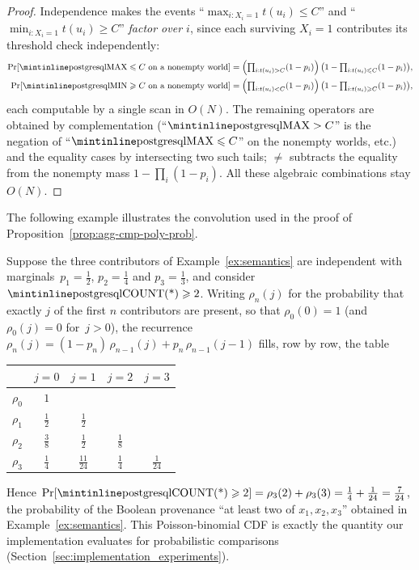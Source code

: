 \begin{proof}
Independence makes the events
``$\max_{i:X_i=1}t(u_i)\le C$''
and ``$\min_{i:X_i=1}t(u_i)\ge C$''
\emph{factor over $i$}, since each surviving $X_i=1$ contributes its
threshold check independently:
\begin{align*}
  \Pr[\text{\sql{MAX}}\le C\text{ on a nonempty world}]
 &=\Bigl(\textstyle\prod_{i:t(u_i)>C}(1-p_i)\Bigr)
   \,\bigl(1-\textstyle\prod_{i:t(u_i)\le C}(1-p_i)\bigr),\\
   \Pr[\text{\sql{MIN}}\ge C\text{ on a nonempty world}]
 &=\Bigl(\textstyle\prod_{i:t(u_i)<C}(1-p_i)\Bigr)
   \,\bigl(1-\textstyle\prod_{i:t(u_i)\ge C}(1-p_i)\bigr),
\end{align*}
each computable by a single scan in $O(N)$.
The remaining operators are obtained by complementation
(``$\text{\sql{MAX}}>C$'' is the negation of ``$\text{\sql{MAX}}\le C$'' on the nonempty
worlds, etc.) and the equality cases by intersecting two such tails;
$\neq$ subtracts the equality from the nonempty mass
$1-\prod_i(1-p_i)$.  All these algebraic combinations stay $O(N)$.
\end{proof}

\begin{toappendix}
The following example illustrates the convolution used in the proof of
Proposition~\ref{prop:agg-cmp-poly-prob}.
\begin{example}\label{ex:poisson-binomial}
Suppose the three contributors of Example~\ref{ex:semantics} are
independent with marginals~$p_1=\tfrac12$, $p_2=\tfrac14$ and
$p_3=\tfrac13$, and consider $\text{\sql{COUNT(*)}}\ge 2$. Writing $\rho_n(j)$
for the probability that exactly $j$ of the first $n$ contributors are
present, so that $\rho_0(0)=1$ (and~$\rho_0(j)=0$ for~$j>0$), the
recurrence $\rho_n(j)=(1-p_n)\,\rho_{n-1}(j)+p_n\,\rho_{n-1}(j-1)$ fills,
row by row, the table
\begin{center}
\begin{tabular}{ccccc}
\toprule
 & $j=0$ & $j=1$ & $j=2$ & $j=3$\\
\midrule
$\rho_0$ & $1$ & & & \\
$\rho_1$ & $\tfrac12$ & $\tfrac12$ & & \\
$\rho_2$ & $\tfrac38$ & $\tfrac12$ & $\tfrac18$ & \\
$\rho_3$ & $\tfrac14$ & $\tfrac{11}{24}$ & $\tfrac14$ & $\tfrac1{24}$\\
\bottomrule
\end{tabular}
\end{center}
Hence
$\Pr[\text{\sql{COUNT(*)}}\ge 2]=\rho_3(2)+\rho_3(3)=\tfrac14+\tfrac1{24}=\tfrac{7}{24}$,
the probability of the Boolean provenance ``at least two of
$x_1,x_2,x_3$'' obtained in Example~\ref{ex:semantics}. This
Poisson-binomial CDF is exactly the quantity our implementation evaluates
for probabilistic  comparisons
(Section~\ref{sec:implementation_experiments}).
\end{example}
\end{toappendix}
